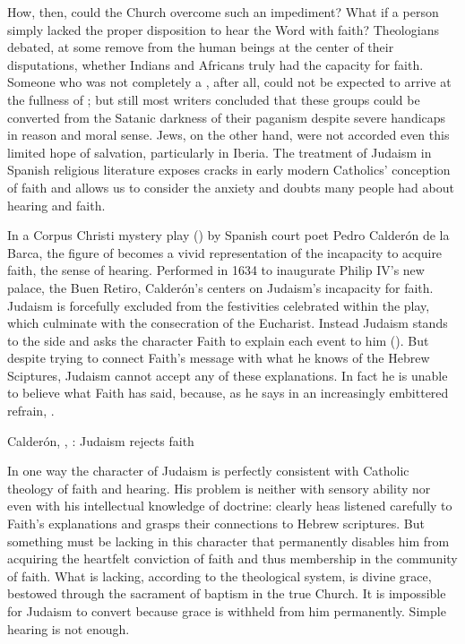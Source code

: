How, then, could the Church overcome such an impediment?
What if a person simply lacked the proper disposition to hear the Word with faith?
Theologians debated, at some remove from the human beings at the center of their disputations, whether Indians and Africans truly had the capacity for faith.
Someone who was not completely a , after all, could not be expected to arrive at the fullness of ; but still most writers concluded that these groups could be converted from the Satanic darkness of their paganism despite severe handicaps in reason and moral sense.
Jews, on the other hand, were not accorded even this limited hope of salvation, particularly in Iberia.
The treatment of Judaism in Spanish religious literature exposes cracks in early modern Catholics' conception of faith and allows us to consider the anxiety and doubts many people had about hearing and faith.

In a Corpus Christi mystery play () by Spanish court poet Pedro Calderón de la Barca, the figure of  becomes a vivid representation of the incapacity to acquire faith,  the sense of hearing.
Performed in 1634 to inaugurate Philip IV's new palace, the Buen Retiro, Calderón's  centers on Judaism's incapacity for faith.%
    \Autocites{Calderon:Retiro}{Reyre:Retiro}{Greer:Retiro}
Judaism is forcefully excluded from the festivities celebrated within the play, which culminate with the consecration of the Eucharist.
Instead Judaism stands to the side and asks the character Faith to explain each event to him ().
But despite trying to connect Faith's message with what he knows of the Hebrew Sciptures, Judaism cannot accept any of these explanations.
In fact he is unable to believe what Faith has said, because, as he says in an increasingly embittered refrain, .

\begin{expoem}
    \caption{Calderón, , : Judaism rejects faith}
    \label{expoem:Calderon-Retiro-Judaismo}
\end{expoem}

In one way the character of Judaism is perfectly consistent with Catholic theology of faith and hearing.
His problem is neither with sensory ability nor even with his intellectual knowledge of doctrine: clearly heas listened carefully to Faith's explanations and grasps their connections to Hebrew scriptures.
But something must be lacking in this character that permanently disables him from acquiring the heartfelt conviction of faith and thus membership in the community of faith.
What is lacking, according to the theological system, is divine grace, bestowed through the sacrament of baptism in the true Church.
It is impossible for Judaism to convert because grace is withheld from him permanently.
Simple hearing is not enough.

